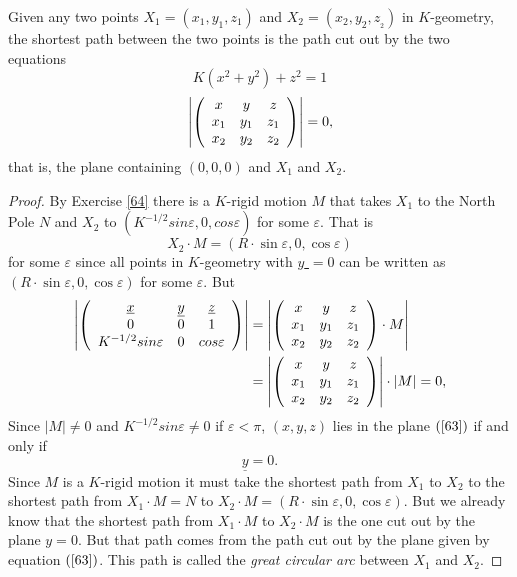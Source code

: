 \documentclass{ximera}
\begin{document}
\begin{theorem}
Given any two points $X_{1}=\left(  x_{1},y_{1},z_{1}\right)  $
and $X_{2}=\left(  x_{2},y_{2},z_{_{2}}\right)  $ in $K$-geometry, the
shortest path between the two points is the path cut out by the two equations%
\[
K\left(  x^{2}+y^{2}\right)  +z^{2}=1
\]%
\begin{equation}
\left\vert \left(
\begin{array}
[c]{ccc}%
x & y & z\\
x_{1} & y_{1} & z_{1}\\
x_{2} & y_{2} & z_{2}%
\end{array}
\right)  \right\vert =0, \label{63}%
\end{equation}
that is, the plane containing $\left(  0,0,0\right)  $ and $X_{1}$ and $X_{2}$.
\end{theorem}

\begin{proof}
By Exercise \ref{64} there is a $K$-rigid motion $M$ that takes $X_{1}$ to the
North Pole $N$ and $X_{2}$ to $\left(  K^{-1/2}sin\varepsilon,0,cos\varepsilon
\right)  $ for some $\varepsilon$. That is%
\[
X_{2}\cdot M=\left(  R\cdot \sin \varepsilon
,0,\cos \varepsilon\right)
\]
for some $\varepsilon$ since all points in $K$-geometry with \underline{$y$%
}$=0$ can be written as $\left(  R\cdot \sin %
\varepsilon,0,\cos \varepsilon\right)  $ for some $\varepsilon$. But%
\begin{align*}
\left\vert \left(
\begin{array}
[c]{ccc}%
\underline{x} & \underline{y} & \underline{z}\\
0 & 0 & 1\\
K^{-1/2}sin\varepsilon & 0 & cos\varepsilon
\end{array}
\right)  \right\vert  &  =\left\vert \left(
\begin{array}
[c]{ccc}%
x & y & z\\
x_{1} & y_{1} & z_{1}\\
x_{2} & y_{2} & z_{2}%
\end{array}
\right)  \cdot M\right\vert \\
&  =\left\vert \left(
\begin{array}
[c]{ccc}%
x & y & z\\
x_{1} & y_{1} & z_{1}\\
x_{2} & y_{2} & z_{2}%
\end{array}
\right)  \right\vert \cdot\left\vert M\right\vert =0,
\end{align*}
Since $\left\vert M\right\vert \neq0$ and $K^{-1/2}sin\varepsilon\neq0$ if
$\varepsilon<\pi$, $\left(  x,y,z\right)  $ lies in the plane $\left(
\ref{63}\right)  $ if and only if
\[
\underline{y}=0.
\]
Since $M$ is a $K$-rigid motion it must take the shortest path from $X_{1}$ to
$X_{2}$ to the shortest path from $X_{1}\cdot M=N$ to $X_{2}\cdot M=\left(
R\cdot \sin \varepsilon,0,\cos %
\varepsilon\right)  $. But we already know that the shortest path from
$X_{1}\cdot M$ to $X_{2}\cdot M$ is the one cut out by the plane $y=0$. But
that path comes from the path cut out by the plane given by equation $\left(
\ref{63}\right)  $. This path is called the \textit{great circular arc}
between $X_{1}$ and $X_{2}$.
\end{proof}
\end{document}
